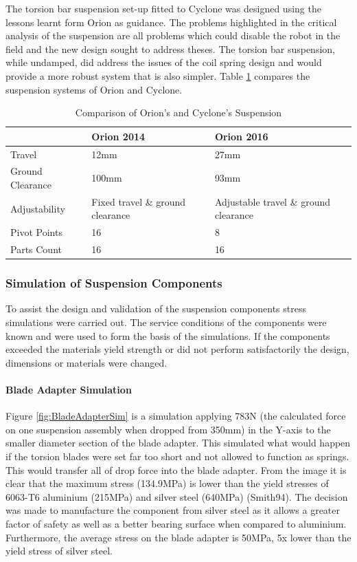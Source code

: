 The torsion bar suspension set-up fitted to Cyclone was designed using the lessons learnt form Orion as guidance. The problems highlighted in the critical analysis of the suspension are all problems which could disable the robot in the field and the new design sought to address theses. The torsion bar suspension, while undamped, did address the issues of the coil spring design and would provide a more robust system that is also simpler. Table \ref{fig:SusComp} compares the suspension systems of Orion and Cyclone.

\begin{table}[h]
\centering
\begin{tabular}{l l l}
\hline
\textbf{} & \textbf{Orion 2014} & \textbf{Orion 2016}\\
\hline
Travel & 12mm & 27mm\\
Ground Clearance & 100mm & 93mm \\
Adjustability & Fixed travel \& ground clearance&  Adjustable travel \& ground clearance\\
Pivot Points & 16 & 8\\
Parts Count & 16 & 16\\
\hline
\end{tabular}
\caption{Comparison of Orion's and Cyclone's Suspension}
\label{fig:SusComp}
\end{table}

\subsubsection{Simulation of Suspension Components}

To assist the design and validation of the suspension components stress simulations were carried out. The service conditions of the components were known and were used to form the basis of the simulations. If the components exceeded the materials yield strength or did not perform satisfactorily the design, dimensions or materials were changed.

\paragraph{Blade Adapter Simulation}

Figure \ref{fig:BladeAdapterSim} is a simulation applying 783N (the calculated force on one suspension assembly when dropped from 350mm) in the Y-axis to the smaller diameter section of the blade adapter. This simulated what would happen if the torsion blades were set far too short and not allowed to function as springs. This would transfer all of drop force into the blade adapter. From the image it is clear that the maximum stress (134.9MPa) is lower than the yield stresses of 6063-T6 aluminium (215MPa) \cite{Davis93} and silver steel (640MPa) (Smith94). The decision was made to manufacture the component from silver steel as it allows a greater factor of safety as well as a better bearing surface when compared to aluminium. Furthermore, the average stress on the blade adapter is 50MPa, 5x lower than the yield stress of silver steel.

